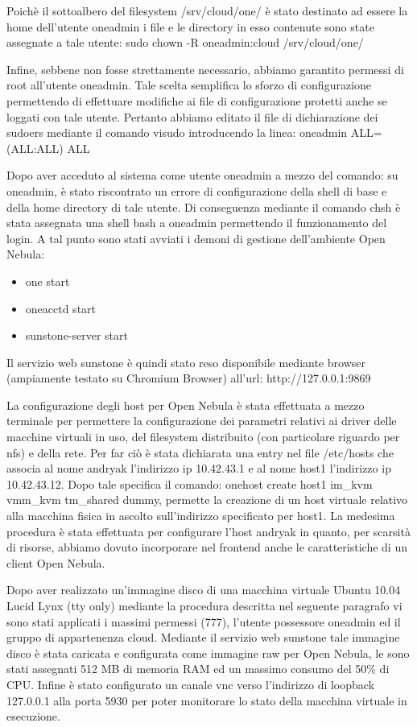 \documentclass[	
	DIV=calc,
	paper=a4,
	fontsize=11pt,
	onecolumn
]{scrartcl} %
\begin{document}
Poichè il sottoalbero del filesystem /srv/cloud/one/ è stato destinato ad essere la home dell'utente oneadmin i file e le directory in esso contenute sono state assegnate a tale utente: sudo chown -R oneadmin:cloud /srv/cloud/one/

Infine, sebbene non fosse strettamente necessario, abbiamo garantito permessi di root all'utente oneadmin. Tale scelta semplifica lo sforzo di configurazione permettendo di effettuare modifiche ai file di configurazione protetti anche se loggati con tale utente. Pertanto abbiamo editato il file di dichiarazione dei sudoers mediante il comando visudo introducendo la linea: oneadmin ALL=(ALL:ALL) ALL

Dopo aver acceduto al sistema come utente oneadmin a mezzo del comando: su oneadmin, è stato riscontrato un errore di configurazione della shell di base e della home directory di tale utente. Di conseguenza mediante il comando chsh è stata assegnata una shell bash a oneadmin permettendo il funzionamento del login. A tal punto sono stati avviati i demoni di gestione dell'ambiente Open Nebula:

\begin{itemize}
	\item one start
	\item oneacctd start
	\item sunstone-server start
\end{itemize}

Il servizio web sunstone è quindi stato reso disponibile mediante browser (ampiamente testato su Chromium Browser) all'url: http://127.0.0.1:9869

La configurazione degli host per Open Nebula è stata effettuata a mezzo terminale per permettere la configurazione dei parametri relativi ai driver delle macchine virtuali in uso, del filesystem distribuito (con particolare riguardo per nfs) e della rete. Per far ciò è stata dichiarata una entry nel file /etc/hosts che associa al nome andryak l'indirizzo ip 10.42.43.1 e al nome host1 l'indirizzo ip 10.42.43.12. Dopo tale specifica il comando: onehost create host1 im\_kvm vmm\_kvm tm\_shared dummy, permette la creazione di un host virtuale relativo alla macchina fisica in ascolto sull'indirizzo specificato per host1. La medesima procedura è stata effettuata per configurare l'host andryak in quanto, per scarsità di risorse, abbiamo dovuto incorporare nel frontend anche le caratteristiche di un client Open Nebula.

Dopo aver realizzato un'immagine disco di una macchina virtuale Ubuntu 10.04 Lucid Lynx (tty only) mediante la procedura descritta nel seguente paragrafo vi sono stati applicati i massimi permessi (777), l'utente possessore oneadmin ed il gruppo di appartenenza cloud. Mediante il servizio web sunstone tale immagine disco è stata caricata e configurata come immagine raw per Open Nebula, le sono stati assegnati 512 MB di memoria RAM ed un massimo consumo del 50\% di CPU. Infine è stato configurato un canale vnc verso l'indirizzo di loopback 127.0.0.1 alla porta 5930 per poter monitorare lo stato della macchina virtuale in esecuzione.
\end{document}
